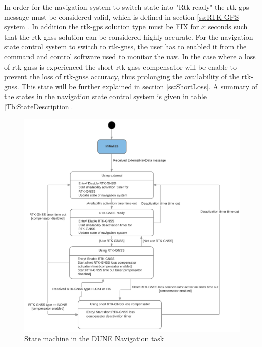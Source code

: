 In order for the navigation system to switch state into "Rtk ready" the \gls{rtk-gps} message must be considered valid, which is defined in section \ref{ss:RTK-GPS system}. In addition the \gls{rtk-gps} solution type must be FIX for $x$ seconds such that the \gls{rtk-gnss} solution can be considered highly accurate. For the navigation state control system to switch to \gls{rtk-gnss}, the user has to enabled it from the command and control software used to monitor the \gls{uav}. In the case where a loss of \gls{rtk-gnss} is experienced the short \gls{rtk-gnss} compensator will be enable to prevent the loss of \gls{rtk-gnss} accuracy, thus prolonging the availability of the \gls{rtk-gnss}. This state will be further explained in section \ref{ss:ShortLoss}. A summary of the states in the navigation state control system is given in table \ref{Tb:StateDescription}.
\begin{figure}[H]
\includegraphics[scale=0.18]{figs/NavigationStateControl.png}
\caption{State machine in the DUNE Navigation task}
\label{Fig:NavState}
\end{figure}
